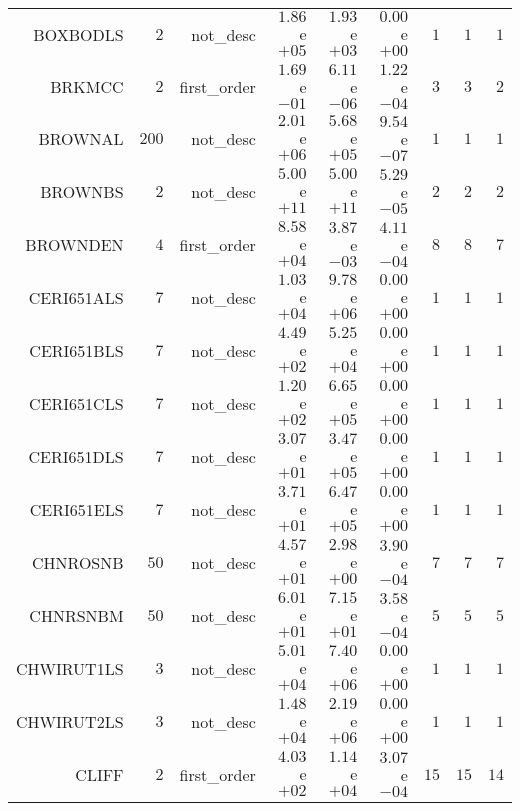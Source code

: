 \begin{longtable}{rrrrrrrrr}
BOXBODLS & \(     2\) & not\_desc & \( 1.86\)e\(+05\) & \( 1.93\)e\(+03\) & \( 0.00\)e\(+00\) & \(     1\) & \(     1\) & \(     1\) \\
BRKMCC & \(     2\) & first\_order & \( 1.69\)e\(-01\) & \( 6.11\)e\(-06\) & \( 1.22\)e\(-04\) & \(     3\) & \(     3\) & \(     2\) \\
BROWNAL & \(   200\) & not\_desc & \( 2.01\)e\(+06\) & \( 5.68\)e\(+05\) & \( 9.54\)e\(-07\) & \(     1\) & \(     1\) & \(     1\) \\
BROWNBS & \(     2\) & not\_desc & \( 5.00\)e\(+11\) & \( 5.00\)e\(+11\) & \( 5.29\)e\(-05\) & \(     2\) & \(     2\) & \(     2\) \\
BROWNDEN & \(     4\) & first\_order & \( 8.58\)e\(+04\) & \( 3.87\)e\(-03\) & \( 4.11\)e\(-04\) & \(     8\) & \(     8\) & \(     7\) \\
CERI651ALS & \(     7\) & not\_desc & \( 1.03\)e\(+04\) & \( 9.78\)e\(+06\) & \( 0.00\)e\(+00\) & \(     1\) & \(     1\) & \(     1\) \\
CERI651BLS & \(     7\) & not\_desc & \( 4.49\)e\(+02\) & \( 5.25\)e\(+04\) & \( 0.00\)e\(+00\) & \(     1\) & \(     1\) & \(     1\) \\
CERI651CLS & \(     7\) & not\_desc & \( 1.20\)e\(+02\) & \( 6.65\)e\(+05\) & \( 0.00\)e\(+00\) & \(     1\) & \(     1\) & \(     1\) \\
CERI651DLS & \(     7\) & not\_desc & \( 3.07\)e\(+01\) & \( 3.47\)e\(+05\) & \( 0.00\)e\(+00\) & \(     1\) & \(     1\) & \(     1\) \\
CERI651ELS & \(     7\) & not\_desc & \( 3.71\)e\(+01\) & \( 6.47\)e\(+05\) & \( 0.00\)e\(+00\) & \(     1\) & \(     1\) & \(     1\) \\
CHNROSNB & \(    50\) & not\_desc & \( 4.57\)e\(+01\) & \( 2.98\)e\(+00\) & \( 3.90\)e\(-04\) & \(     7\) & \(     7\) & \(     7\) \\
CHNRSNBM & \(    50\) & not\_desc & \( 6.01\)e\(+01\) & \( 7.15\)e\(+01\) & \( 3.58\)e\(-04\) & \(     5\) & \(     5\) & \(     5\) \\
CHWIRUT1LS & \(     3\) & not\_desc & \( 5.01\)e\(+04\) & \( 7.40\)e\(+06\) & \( 0.00\)e\(+00\) & \(     1\) & \(     1\) & \(     1\) \\
CHWIRUT2LS & \(     3\) & not\_desc & \( 1.48\)e\(+04\) & \( 2.19\)e\(+06\) & \( 0.00\)e\(+00\) & \(     1\) & \(     1\) & \(     1\) \\
CLIFF & \(     2\) & first\_order & \( 4.03\)e\(+02\) & \( 1.14\)e\(+04\) & \( 3.07\)e\(-04\) & \(    15\) & \(    15\) & \(    14\) \\

\end{longtable}
